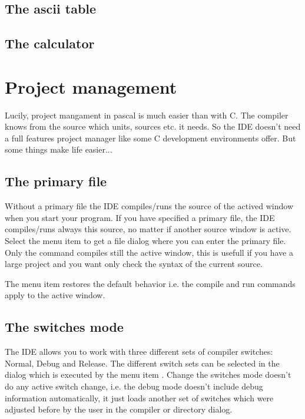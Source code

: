 \subsection{The ascii table}

\subsection{The calculator}


\section{Project management}
\label{ide:projectmanagement}
Lucily, project mangament in pascal is much easier than with C. The
compiler knows from the source which units, sources etc. it needs.
So the \fpc IDE doesn't need a full features project manager like
some C development environments offer. But some things make life easier...

\subsection{The primary file}
Without a primary file the IDE compiles/runs the source of the actived
window when you start your program. If you have specified a primary
file, the IDE compiles/runs always this source, no matter if another
source window is active. Select the menu item 
to get a file dialog where you can enter the primary file. Only the command
 compiles still the active window, this is usefull
if you have a large project and you want only check the syntax of the
current source.

The menu item  restores the default behavior
i.e. the compile and run commands apply to the active window.

\subsection{The switches mode}
The IDE allows you to work with three different sets of compiler
switches: Normal, Debug and Release. The different switch
sets can be selected in the  dialog which
is executed by the menu item .
Change the switches mode doesn't do any active switch change, i.e.
the debug mode doesn't include debug information automatically,
it just loads another set of switches which were adjusted before
by the user in the compiler or directory dialog.

